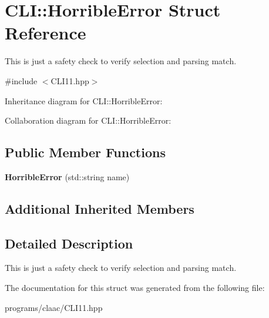 \hypertarget{struct_c_l_i_1_1_horrible_error}{}\section{C\+LI\+:\+:Horrible\+Error Struct Reference}
\label{struct_c_l_i_1_1_horrible_error}


This is just a safety check to verify selection and parsing match.  




{\ttfamily \#include $<$C\+L\+I11.\+hpp$>$}



Inheritance diagram for C\+LI\+:\+:Horrible\+Error\+:


Collaboration diagram for C\+LI\+:\+:Horrible\+Error\+:
\subsection*{Public Member Functions}
\begin{DoxyCompactItemize}
\item 
\mbox{\label{struct_c_l_i_1_1_horrible_error_a4883192c5b7e3f2a263caf24a09a86ec}} 
{\bfseries Horrible\+Error} (std\+::string name)
\end{DoxyCompactItemize}
\subsection*{Additional Inherited Members}


\subsection{Detailed Description}
This is just a safety check to verify selection and parsing match. 

The documentation for this struct was generated from the following file\+:\begin{DoxyCompactItemize}
\item 
programs/claac/C\+L\+I11.\+hpp\end{DoxyCompactItemize}
